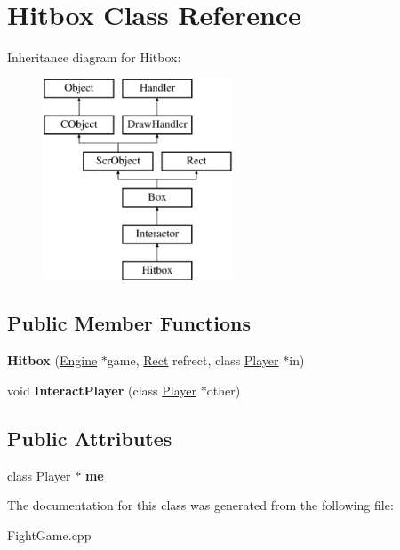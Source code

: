 \hypertarget{class_hitbox}{}\section{Hitbox Class Reference}
\label{class_hitbox}
Inheritance diagram for Hitbox\+:\begin{figure}[H]
\begin{center}
\leavevmode
\includegraphics[height=6.000000cm]{class_hitbox}
\end{center}
\end{figure}
\subsection*{Public Member Functions}
\begin{DoxyCompactItemize}
\item 
\hypertarget{class_hitbox_a986c9a4829e3ce01e590ffdfe5835699}{}\label{class_hitbox_a986c9a4829e3ce01e590ffdfe5835699} 
{\bfseries Hitbox} (\hyperlink{class_engine}{Engine} $\ast$game, \hyperlink{class_rect}{Rect} refrect, class \hyperlink{class_player}{Player} $\ast$in)
\item 
\hypertarget{class_hitbox_a4885229ccba5a16403919055e8778923}{}\label{class_hitbox_a4885229ccba5a16403919055e8778923} 
void {\bfseries Interact\+Player} (class \hyperlink{class_player}{Player} $\ast$other)
\end{DoxyCompactItemize}
\subsection*{Public Attributes}
\begin{DoxyCompactItemize}
\item 
\hypertarget{class_hitbox_ab3d848f9286164ba8cbb6a85c441d0f5}{}\label{class_hitbox_ab3d848f9286164ba8cbb6a85c441d0f5} 
class \hyperlink{class_player}{Player} $\ast$ {\bfseries me}
\end{DoxyCompactItemize}


The documentation for this class was generated from the following file\+:\begin{DoxyCompactItemize}
\item 
Fight\+Game.\+cpp\end{DoxyCompactItemize}
